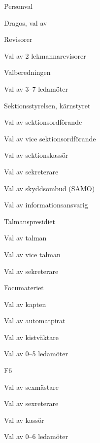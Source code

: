 \documentclass{sektionsmote}
\begin{document}
\begin{ootd}
\item{Personval}
\begin{ootd}
    \item Dragos, val av
    \item Revisorer
    \begin{ootd}
        \item Val av 2 lekmannarevisorer
    \end{ootd}
    \item Valberedningen
    \begin{ootd}
        \item Val av 3--7 ledamöter
    \end{ootd}
    \item Sektionsstyrelsen, kärnstyret
    \begin{ootd}
        \item Val av sektionsordförande
        \item Val av vice sektionsordförande
        \item Val av sektionskassör
        \item Val av sekreterare
        \item Val av skyddsombud (SAMO)
        \item Val av informationsansvarig
    \end{ootd}
    \item Talmanspresidiet
    \begin{ootd}
        \item Val av talman
        \item Val av vice talman
        \item Val av sekreterare
    \end{ootd}
    \item Focumateriet
    \begin{ootd}
        \item Val av kapten
        \item Val av automatpirat
        \item Val av kistväktare
        \item Val av 0--5 ledamöter
    \end{ootd}
    \item F6
    \begin{ootd}
        \item Val av sexmästare
        \item Val av sexreterare
        \item Val av kassör
        \item Val av 0--6 ledamöter

\end{ootd}
\end{ootd}
\end{ootd}
\end{document}
